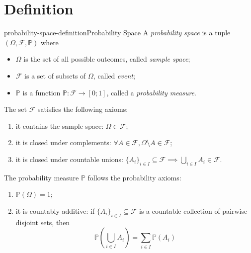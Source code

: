\documentclass[preview]{standalone}
\begin{document}
\genpage

% 

\section{Definition}

\begin{snippetdefinition}{probability-space-definition}{Probability Space}
    A \textit{probability space} is a tuple \((\Omega, \mathcal{F}, \mathbb{P})\)
    where
    \begin{itemize}
        \item \(\Omega\) is the set of all possible outcomes, called \textit{sample space};
        \item \(\mathcal{F}\) is a set of subsets of \(\Omega\), called \textit{event};
        \item \(\mathbb{P}\) is a function \(\mathbb{P}\colon \mathcal{F} \to [0;1]\), called a \textit{probability measure}. 
    \end{itemize}
    The set \(\mathcal{F}\) satisfies the following axioms:
    \begin{enumerate}
        \item it contains the sample space: \(\Omega \in \mathcal{F}\);
        \item it is closed under complements: \(\forall A \in \mathcal{F}, \Omega \setminus A \in \mathcal{F}\);
        \item it is closed under countable unions: \({\{A_i\}}_{i \in I} \subseteq \mathcal{F} \implies \bigcup_{i \in I}A_i \in \mathcal{F}\).
    \end{enumerate}
    The probability measure \(\mathbb{P}\) follows the probability axioms:
    \begin{enumerate}
        \item \(\mathbb{P}(\Omega) = 1\);
        \item it is countably additive: if \({\{A_i\}}_{i \in I} \subseteq \mathcal{F}\)
        is a countable collection of pairwise disjoint sets, then
        \[
            \mathbb{P}\left(\bigcup_{i \in I}A_i\right) = \sum_{i \in I} \mathbb{P}(A_i)
        \]
    \end{enumerate}
\end{snippetdefinition}
\end{document}
